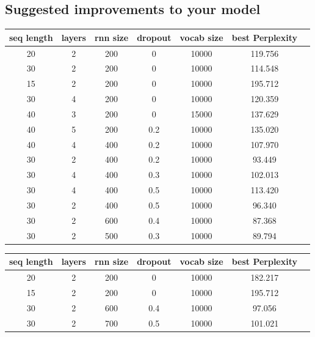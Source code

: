 \documentclass{article}
\begin{document}
\subsection{Suggested improvements to your model}


\begin{center}
\begin{tabular}{ |c|c|c|c|c|c|c|} 
\hline
seq length & layers & rnn size & dropout  & vocab size & best Perplexity\\
\hline
 20 & 2 & 200 & 0 &  10000 & 119.756\\ 
 30 & 2 & 200 & 0 &  10000 & 114.548\\ 
 15 & 2 & 200 & 0 &  10000 & 195.712\\ 
  30 & 4 & 200 & 0 & 10000 & 120.359\\
  40 & 3 & 200 & 0 & 15000 & 137.629\\
  \hline
 40 & 5 & 200 & 0.2 & 10000 & 135.020\\
 40 & 4 & 400 & 0.2 & 10000 & 107.970\\
 30 & 2 & 400 & 0.2 & 10000 & 93.449\\
 30 & 4 & 400 & 0.3 & 10000 & 102.013\\
  30 & 4 & 400 & 0.5 & 10000 & 113.420\\
  
  30 & 2 & 400 & 0.5 &  10000 & 96.340\\
  30 & 2 & 600 & 0.4 &  10000 & 87.368\\  
  30 & 2 & 500 & 0.3 &  10000 & 89.794\\  
   
\hline
\end{tabular}
\end{center}

\begin{center}
\begin{tabular}{ |c|c|c|c|c|c|c|} 
\hline
seq length & layers & rnn size & dropout & vocab size & best Perplexity\\
\hline
 20 & 2 & 200 & 0 &  10000 & 182.217\\ 
 15 & 2 & 200 & 0 &  10000 & 195.712\\ 
 30 & 2 & 600 & 0.4 &  10000 & 97.056\\
 
 30 & 2 & 700 & 0.5 & 10000 & 101.021\\  

\hline
\end{tabular}
\end{center}
\end{document}
